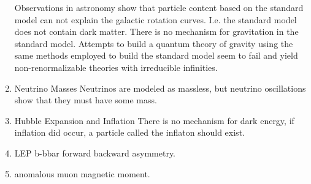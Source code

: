     \begin{enumerate}
       Observations in astronomy show that particle content based on the standard model can not explain the galactic rotation curves. I.e. the standard model does not contain dark matter.\cite{particle_dm}
       There is no mechanism for gravitation in the standard model. Attempts to build a quantum theory of gravity using the same methods employed to build the standard model seem to fail and yield non-renormalizable theories with irreducible infinities.
      \item{Neutrino Masses} Neutrinos are modeled as massless, but neutrino oscillations show that they must have some mass.
      \item{Hubble Expansion and Inflation} There is no mechanism for dark energy, if inflation did occur, a particle called the inflaton should exist.
      \item LEP b-bbar forward backward asymmetry.
      \item anomalous muon magnetic moment.
    \end{enumerate}

